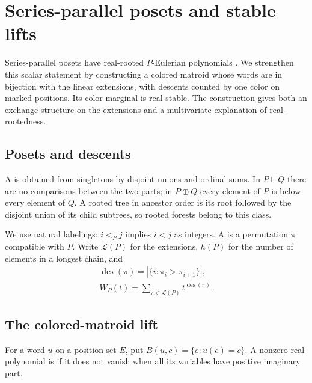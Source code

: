 
\section[seriesParallel]{Series-parallel posets and stable lifts}

Series-parallel posets have real-rooted $P$-Eulerian polynomials
\cite{Wagner1992en,Wagner1992}. We strengthen this scalar statement by
constructing a colored matroid whose words are in bijection with the linear
extensions, with descents counted by one color on marked positions.
Its color marginal is real stable. The construction gives both an exchange
structure on the extensions and a multivariate explanation of real-rootedness.

\subsection[seriesParallelPosets]{Posets and descents}

A  is obtained from singletons by disjoint
unions and ordinal sums. In $P\sqcup Q$ there are no comparisons between
the two parts; in $P\oplus Q$ every element of $P$ is below every element
of $Q$. A rooted tree in ancestor order is its root followed by the disjoint
union of its child subtrees, so rooted forests belong to this class.

We use natural labelings: $i<_P j$ implies $i<j$ as integers.
A  is a permutation $\pi$ compatible with $P$.
Write $\mathcal L(P)$ for the extensions, $h(P)$ for the number of elements
in a longest chain, and
\[
 \begin{gathered}
 \operatorname{des}(\pi)
 =|\{i:\pi_i>\pi_{i+1}\}|,\\
 W_P(t)=\sum_{\pi\in\mathcal L(P)}t^{\operatorname{des}(\pi)}.
 \end{gathered}
\]

\subsection[seriesParallelLift]{The colored-matroid lift}

For a word $u$ on a position set $E$, put
$B(u,c)=\{e:u(e)=c\}$. A nonzero real polynomial is 
if it does not vanish when all its variables have positive imaginary part.

